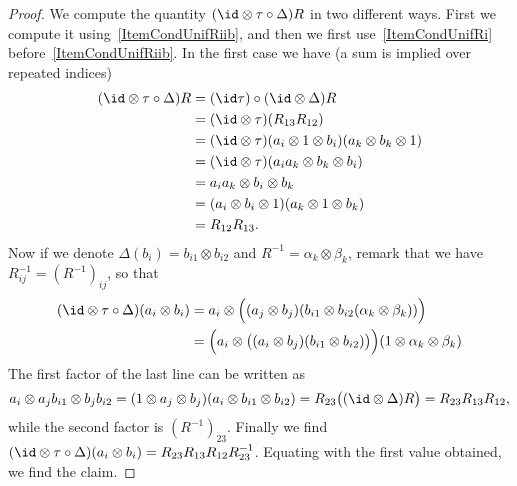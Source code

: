 \begin{proof}
	We compute the quantity $(\id\otimes\tau\circ\Delta)R$ in two different ways. First we compute it using~\ref{ItemCondUnifRiib}, and then we first use~\ref{ItemCondUnifRi} before~\ref{ItemCondUnifRiib}. In the first case we have (a sum is implied over repeated indices)
	\begin{align*}
		(\id\otimes\tau\circ\Delta)R & =(\id\tau)\circ(\id\otimes\Delta)R                                  \\
		                             & =(\id\otimes\tau)(R_{13}R_{12})                                     \\
		                             & =(\id\otimes\tau)(a_i\otimes 1\otimes b_i)(a_k\otimes b_k\otimes 1) \\
		                             & =(\id\otimes\tau)(a_ia_k\otimes b_k\otimes b_i)                     \\
		                             & =a_ia_k\otimes b_i\otimes b_k                                       \\
		                             & =(a_i\otimes b_i\otimes 1)(a_k\otimes 1\otimes b_k)                 \\
		                             & =R_{12}R_{13}.
	\end{align*}
	Now if we denote $\Delta(b_i)=b_{i1}\otimes b_{i2}$ and $R^{-1}=\alpha_k\otimes\beta_k$, remark that we have $R_{ij}^{-1}=(R^{-1})_{ij}$, so that
	\begin{align*}
		(\id\otimes\tau\circ\Delta)(a_i\otimes b_i) & =a_i\otimes\Big( (a_j\otimes b_j)(b_{i1}\otimes b_{i2}(\alpha_k\otimes\beta_k))   \Big)                   \\
		                                            & =\Big( a_i\otimes\big( (a_i\otimes b_j)(b_{i1}\otimes b_{i2}) \big) \Big)(1\otimes\alpha_k\otimes\beta_k)
	\end{align*}
	The first factor of the last line can be written as
	\[
		a_i\otimes a_jb_{i1}\otimes b_jb_{i2}=(1\otimes a_j\otimes b_j)(a_i\otimes b_{i1}\otimes b_{i2})=R_{23}\big( (\id\otimes\Delta)R \big)=R_{23}R_{13}R_{12},
	\]
	while the second factor is $(R^{-1})_{23}$. Finally we find $(\id\otimes\tau\circ\Delta)(a_i\otimes b_i)=R_{23}R_{13}R_{12}R_{23}^{-1}$. Equating with the first value obtained, we find the claim.
\end{proof}



